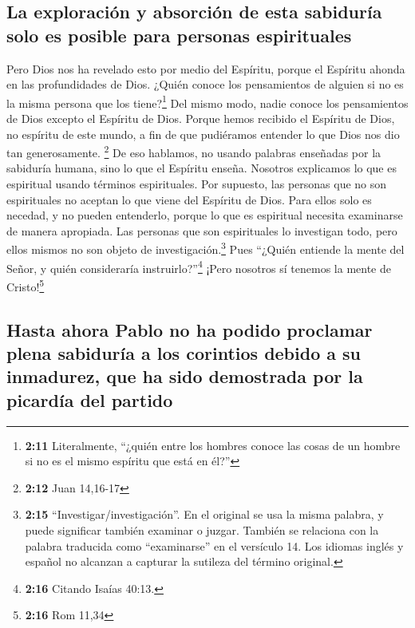 \hypertarget{la-exploraciuxf3n-y-absorciuxf3n-de-esta-sabiduruxeda-solo-es-posible-para-personas-espirituales}{%
\subsection{La exploración y absorción de esta sabiduría solo es posible
para personas
espirituales}\label{la-exploraciuxf3n-y-absorciuxf3n-de-esta-sabiduruxeda-solo-es-posible-para-personas-espirituales}}

 Pero Dios nos ha revelado esto por medio del Espíritu,
porque el Espíritu ahonda en las profundidades de Dios. 
¿Quién conoce los pensamientos de alguien si no es la misma persona que
los tiene?\footnote{\textbf{2:11} Literalmente, ``¿quién entre los
  hombres conoce las cosas de un hombre si no es el mismo espíritu que
  está en él?''} Del mismo modo, nadie conoce los pensamientos de Dios
excepto el Espíritu de Dios.  Porque hemos recibido el
Espíritu de Dios, no espíritu de este mundo, a fin de que pudiéramos
entender lo que Dios nos dio tan generosamente. \footnote{\textbf{2:12}
  Juan 14,16-17}  De eso hablamos, no usando palabras
enseñadas por la sabiduría humana, sino lo que el Espíritu enseña.
Nosotros explicamos lo que es espiritual usando términos espirituales.
 Por supuesto, las personas que no son espirituales no
aceptan lo que viene del Espíritu de Dios. Para ellos solo es necedad, y
no pueden entenderlo, porque lo que es espiritual necesita examinarse de
manera apropiada.  Las personas que son espirituales lo
investigan todo, pero ellos mismos no son objeto de
investigación.\footnote{\textbf{2:15} ``Investigar/investigación''. En
  el original se usa la misma palabra, y puede significar también
  examinar o juzgar. También se relaciona con la palabra traducida como
  ``examinarse'' en el versículo 14. Los idiomas inglés y español no
  alcanzan a capturar la sutileza del término original.} 
Pues ``¿Quién entiende la mente del Señor, y quién consideraría
instruirlo?''\footnote{\textbf{2:16} Citando Isaías 40:13.} ¡Pero
nosotros sí tenemos la mente de Cristo!\footnote{\textbf{2:16} Rom 11,34}

\hypertarget{hasta-ahora-pablo-no-ha-podido-proclamar-plena-sabiduruxeda-a-los-corintios-debido-a-su-inmadurez-que-ha-sido-demostrada-por-la-picarduxeda-del-partido}{%
\subsection{Hasta ahora Pablo no ha podido proclamar plena sabiduría a
los corintios debido a su inmadurez, que ha sido demostrada por la
picardía del
partido}\label{hasta-ahora-pablo-no-ha-podido-proclamar-plena-sabiduruxeda-a-los-corintios-debido-a-su-inmadurez-que-ha-sido-demostrada-por-la-picarduxeda-del-partido}}

